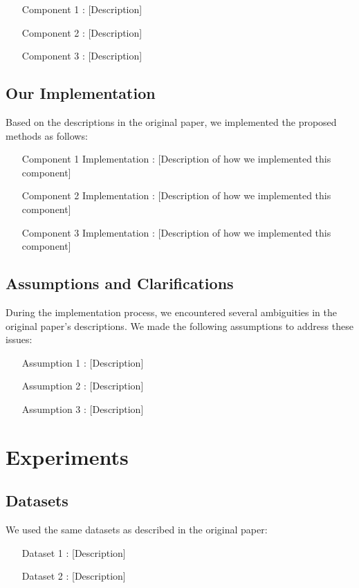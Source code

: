 \documentclass[10pt,twocolumn,letterpaper]{article}
\begin{document}
\begin{itemize}
    \item [Component 1]: [Description]
    \item [Component 2]: [Description]
    \item [Component 3]: [Description]
\end{itemize}

\subsection{Our Implementation}
Based on the descriptions in the original paper, we implemented the proposed methods as follows:

\begin{itemize}
    \item [Component 1 Implementation]: [Description of how we implemented this component]
    \item [Component 2 Implementation]: [Description of how we implemented this component]
    \item [Component 3 Implementation]: [Description of how we implemented this component]
\end{itemize}

\subsection{Assumptions and Clarifications}
During the implementation process, we encountered several ambiguities in the original paper's descriptions. We made the following assumptions to address these issues:

\begin{itemize}
    \item [Assumption 1]: [Description]
    \item [Assumption 2]: [Description]
    \item [Assumption 3]: [Description]
\end{itemize}

\section{Experiments}
\label{sec:experiments}

\subsection{Datasets}
We used the same datasets as described in the original paper:

\begin{itemize}
    \item [Dataset 1]: [Description]
    \item [Dataset 2]: [Description]
\end{itemize}
\end{document}
